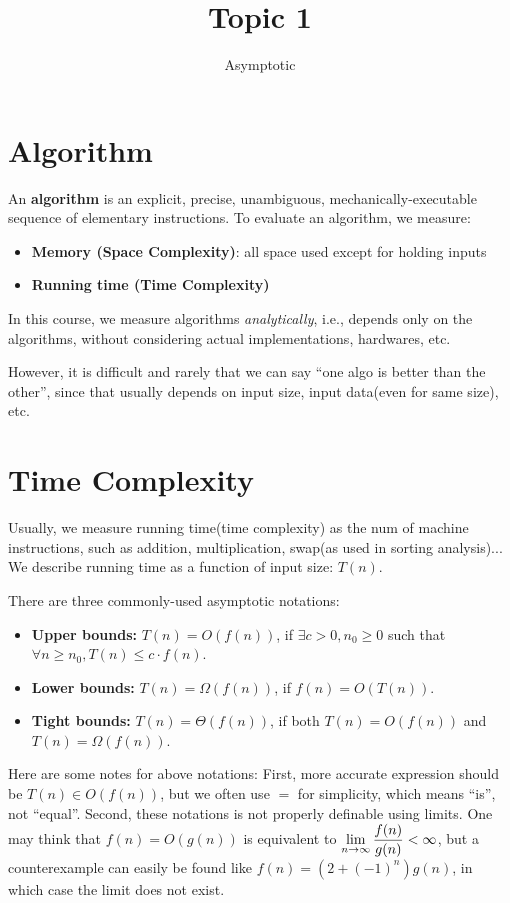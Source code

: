 \documentclass[11pt, a4paper]{COMP3711}
\title{Topic 1}
\subtitle{Asymptotic}
\begin{document}
\begin{spacing}{1.5}
    
    \section{Algorithm}

    An \textbf{algorithm} is an explicit, precise, unambiguous, mechanically-executable
    sequence of elementary instructions. To evaluate an algorithm, we measure:
    \begin{itemize}
        \item {\bf Memory (Space Complexity)}: 
        all space used except for holding inputs
        \item {\bf Running time (Time Complexity)}  
    \end{itemize}

    In this course, we measure algorithms {\it analytically}, i.e., 
    depends only on the algorithms, without considering actual
    implementations, hardwares, etc. 

    However, it is difficult and rarely that we can say
    ``one algo is better than the other'', since that usually 
    depends on input size, input data(even for same size), etc.

    \section{Time Complexity}

    Usually, we measure running time(time complexity) as the num
    of machine instructions, such as addition, multiplication,
    swap(as used in sorting analysis)... We describe running time
    as a function of input size: $T(n)$.

    There are three commonly-used asymptotic notations:
    \begin{itemize}
        \item {\bf Upper bounds:} $T(n)=O(f(n))$, if
        $\exists c>0, n_0\ge 0$ such that 
        $\forall n\ge n_0, T(n)\le c\cdot f(n)$.
        \item {\bf Lower bounds:} $T(n)=\Omega(f(n))$, 
        if $f(n)=O(T(n))$.
        \item {\bf Tight bounds:} $T(n)=\Theta(f(n))$,
        if both $T(n)=O(f(n))$ and $T(n)=\Omega (f(n))$.
    \end{itemize}

    Here are some notes for above notations: 
    First, more accurate expression should be $T(n)\in O(f(n))$,
    but we often use $=$ for simplicity, which means ``is'', not ``equal''.
    Second, these notations is not properly definable using limits.
    One may think that $f(n)=O(g(n))$ is equivalent to 
    $\displaystyle \lim_{n\rightarrow \infty} \frac{f(n)}{g(n)}<\infty$, 
    but a counterexample can easily be found like 
    $f(n)=(2+(-1)^{n})g(n)$, in which case the limit does not exist.


\end{spacing}
\end{document}
